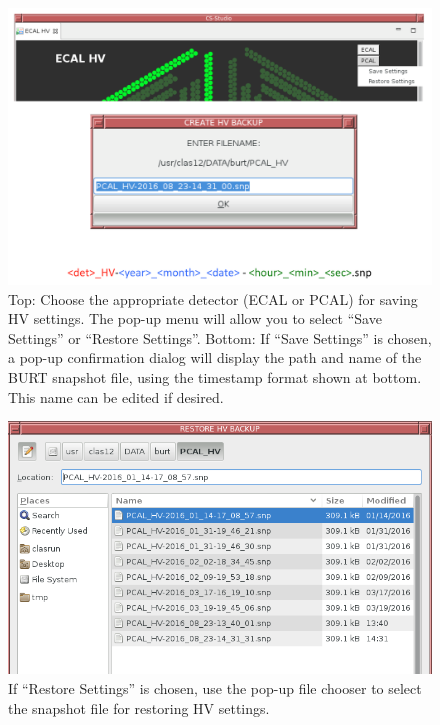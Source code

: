 \documentclass[letterpaper,10pt]{article}
\begin{document}
\begin{figure}[htbp]
  \centering
  \includegraphics[width= 5in, keepaspectratio = true]{burt-save.png}
  \vspace{2mm}
  \caption{Top: Choose the appropriate detector (ECAL or PCAL) for saving HV settings.  The pop-up menu will
    allow you to select ``Save Settings'' or ``Restore Settings''.  Bottom: If ``Save Settings'' is chosen,
    a pop-up confirmation dialog will display the path and name of the BURT snapshot file, using the timestamp format shown at bottom.
    This name can be edited if desired.}
\label{backup-restore1}
\end{figure}
\begin{figure}[htbp]
  \centering
  \includegraphics[width= 5in, keepaspectratio = true]{burt-restore.png}
  \vspace{2mm}
  \caption{If ``Restore Settings'' is chosen, use the pop-up file chooser to select the snapshot
    file for restoring HV settings.}
\label{backup-restore2}
\end{figure}
\end{document}
